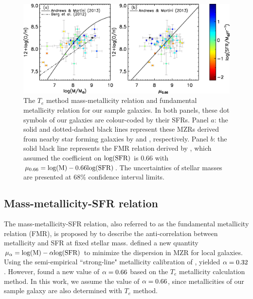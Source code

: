 \documentclass[usenatbib]{raa}
\begin{document}
\begin{figure}[h]
\center
\includegraphics[width=1.0\textwidth]{fig5.eps}
\caption{The $T_e$ method mass-metallicity relation and fundamental
metallicity relation for our sample galaxies. In both panels, these dot 
symbols of our galaxies are colour-coded by their SFRs. Panel $a$: the solid and
dotted-dashed black lines represent these MZRs
derived from nearby star forming galaxies by \cite{2013ApJ...765..140A} and
\cite{2012ApJ...754...98B}, respectively.
 Panel
$b$: the solid black line represents the FMR relation derived by
\cite{2013ApJ...765..140A}, which assumed the coefficient on $\rm log(SFR)$
is 0.66 with $\rm \mu_{0.66} = log(M) - 0.66 log(SFR)$. The uncertainties 
of stellar masses are presented at 68$\%$ confidence interval limits.} 
 
\label{fmr_rela}
\end{figure}

\subsection{Mass-metallicity-SFR relation}
\label{fmr}

The mass-metallicity-SFR relation, also  referred to as the 
fundamental metallicity relation (FMR), is proposed by 
\cite{2010MNRAS.408.2115M} to describe the anti-correlation between
metallicity and SFR  at fixed stellar mass. 
\cite{2010MNRAS.408.2115M}
defined a new quantity $\rm \mu_{\alpha} = log(M)-\alpha log(SFR)$ to 
minimize the dispersion in MZR  for 
local galaxies. Using the semi-empirical ``strong-line" metallicity 
calibration of \cite{2008AA...488..463M}, \cite{2010MNRAS.408.2115M} yielded 
$\rm \alpha = 0.32$. However, \cite{2013ApJ...765..140A} found a new value of
$\rm \alpha=0.66$ based on the  $T_e$ metallicity calculation method.
 In this work,
we assume the value of $\rm \alpha=0.66$, since metallicities of our sample galaxy
are also determined with $T_e$ method.
\end{document}

